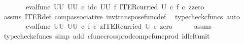 \begin{isabellebody}
\ \ \isamarkupfalse%
\ \isamarkupfalse%
\ {\isachardoublequoteopen}{\isachardot}{\kern0pt}{\isachardot}{\kern0pt}{\isachardot}{\kern0pt}\ {\isacharequal}{\kern0pt}\ {\isacharparenleft}{\kern0pt}eval{\isacharunderscore}{\kern0pt}func\ {\isacharparenleft}{\kern0pt}U\isactrlbsup U\isactrlesup {\isacharparenright}{\kern0pt}\ {\isacharparenleft}{\kern0pt}U\isactrlbsup U\isactrlesup {\isacharparenright}{\kern0pt}{\isacharparenright}{\kern0pt}\ {\isasymcirc}\isactrlsub c\ {\isacharparenleft}{\kern0pt}id\isactrlsub c\ {\isacharparenleft}{\kern0pt}U\isactrlbsup U\isactrlesup {\isacharparenright}{\kern0pt}\ {\isasymtimes}\isactrlsub f\ ITER{\isacharunderscore}{\kern0pt}curried\ U{\isacharparenright}{\kern0pt}\ {\isasymcirc}\isactrlsub c\ {\isasymlangle}f\ {\isasymcirc}\isactrlsub c\ z{\isacharcomma}{\kern0pt}zero{\isasymrangle}{\isachardoublequoteclose}\isanewline
\ \ \ \ \isamarkupfalse%
\ assms\ ITER{\isacharunderscore}{\kern0pt}def\ comp{\isacharunderscore}{\kern0pt}associative{}\ inv{\isacharunderscore}{\kern0pt}transpose{\isacharunderscore}{\kern0pt}func{\isacharunderscore}{\kern0pt}def{}\ \isamarkupfalse%
\ {\isacharparenleft}{\kern0pt}typecheck{\isacharunderscore}{\kern0pt}cfuncs{\isacharcomma}{\kern0pt}\ auto{\isacharparenright}{\kern0pt}\isanewline
\ \ \isamarkupfalse%
\ \isamarkupfalse%
\ {\isachardoublequoteopen}{\isachardot}{\kern0pt}{\isachardot}{\kern0pt}{\isachardot}{\kern0pt}\ {\isacharequal}{\kern0pt}\ {\isacharparenleft}{\kern0pt}eval{\isacharunderscore}{\kern0pt}func\ {\isacharparenleft}{\kern0pt}U\isactrlbsup U\isactrlesup {\isacharparenright}{\kern0pt}\ {\isacharparenleft}{\kern0pt}U\isactrlbsup U\isactrlesup {\isacharparenright}{\kern0pt}{\isacharparenright}{\kern0pt}\ {\isasymcirc}\isactrlsub c\ {\isasymlangle}f\ {\isasymcirc}\isactrlsub c\ z{\isacharcomma}{\kern0pt}ITER{\isacharunderscore}{\kern0pt}curried\ U\ {\isasymcirc}\isactrlsub c\ zero{\isasymrangle}{\isachardoublequoteclose}\isanewline
\ \ \ \ \isamarkupfalse%
\ assms\ \isamarkupfalse%
\ {\isacharparenleft}{\kern0pt}typecheck{\isacharunderscore}{\kern0pt}cfuncs{\isacharcomma}{\kern0pt}\ simp\ add{\isacharcolon}{\kern0pt}\ cfunc{\isacharunderscore}{\kern0pt}cross{\isacharunderscore}{\kern0pt}prod{\isacharunderscore}{\kern0pt}comp{\isacharunderscore}{\kern0pt}cfunc{\isacharunderscore}{\kern0pt}prod\ id{\isacharunderscore}{\kern0pt}left{\isacharunderscore}{\kern0pt}unit{}{\isacharparenright}{\kern0pt}\isanewline
\ \ \isamarkupfalse%

\end{isabellebody}
